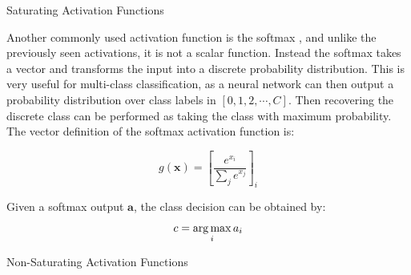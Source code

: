 \begin{marginfigure}[-8em]
	 \caption{Saturating Activation Functions}
	 \label{background:saturatingActivations}
\end{marginfigure}

Another commonly used activation function is the softmax \cite{bishop2006pattern}, and unlike the previously seen activations, it is not a scalar function. Instead the softmax takes a vector and transforms the input into a discrete probability distribution. This is very useful for multi-class classification, as a neural network can then output a probability distribution over class labels in $[0, 1, 2, \cdots, C]$. Then recovering the discrete class can be performed as taking the class with maximum probability. The vector definition of the softmax activation function is:

\begin{equation}
	g(\textbf{x}) = \left[ \frac{e^{x_i}}{\sum_j e^{x_j} } \right]_i
	\label{background:softmax}
\end{equation}

Given a softmax output $\textbf{a}$, the class decision can be obtained by:
\vspace*{1em}
\begin{equation}
	c = \operatorname*{arg\,max}_i a_i
\end{equation}

\begin{marginfigure}
    \caption{Non-Saturating Activation Functions}
    \label{background:nonSaturatingActivations}
\end{marginfigure}

